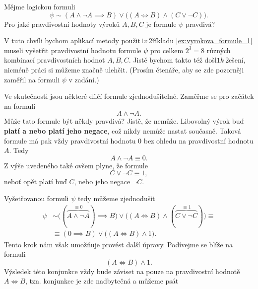 \begin{example}\label{ex:vyrokova_formule_2}
    Mějme logickou formuli
    \begin{equation*}
        \psi\sim (A \land \neg A \implies B) \lor \bigl((A \iff B) \land (C \lor \neg C)\bigr).
    \end{equation*}
    Pro jaké pravdivostní hodnoty výroků $A,B,C$ je formule $\psi$ pravdivá?
    \begin{solution}
        V tuto chvíli bychom aplikací metody použit$1 v~$2říkladu \ref{ex:vyrokova_formule_1} museli vyšetřit pravdivostní hodnotu formule $\psi$ pro celkem $2^3=8$ různých kombinací pravdivostních hodnot $A,B,C$. Jistě bychom takto též došl$1 k~$2ešení, nicméně práci si můžeme značně ulehčit. (Prosím čtenáře, aby se zde pozorněji zaměřil na formuli $\psi$ v zadání.)\par
        Ve skutečnosti jsou některé dílčí formule zjednodušitelné. Zaměřme se pro začátek na formuli
        \begin{equation*}
            A \land \neg A.
        \end{equation*}
        Může tato formule být někdy pravdivá? Jistě, že nemůže. Libovolný výrok buď \textbf{platí a nebo platí jeho negace}, což nikdy nemůže nastat současně. Taková formule má pak vždy pravdivostní hodnotu 0 bez ohledu na pravdivostní hodnotu $A$. Tedy
        \begin{equation*}
            A \land \neg A\equiv 0.
        \end{equation*}
        Z výše uvedeného také ovšem plyne, že formule
        \begin{equation*}
            C \lor \neg C\equiv 1,
        \end{equation*}
        neboť opět platí buď $C$, nebo jeho negace $\neg C$.\par
        Vyšetřovanou formuli $\psi$ tedy můžeme zjednodušit
        \begin{align*}
            \psi&\sim \bigl((\overbrace{A \land \neg A}^{\equiv 0}) \implies B\bigr) \lor \bigl((A \iff B) \land (\overbrace{C \lor \neg C}^{\equiv 1})\bigr)\equiv  \\ &\equiv (0 \implies B) \lor \bigl((A \iff B) \land 1\bigr).
        \end{align*}
        Tento krok nám však umožňuje provést další úpravy. Podívejme se blíže na formuli
        \begin{equation*}
            (A \iff B) \land 1.
        \end{equation*}
        Výsledek této konjunkce vždy bude záviset na pouze na pravdivostní hodnotě $A \iff B$, tzn. konjunkce je zde nadbytečná a můžeme psát

\end{solution}
\end{example}
